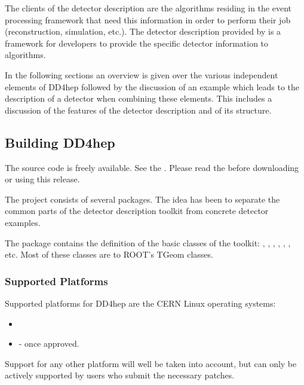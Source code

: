 \documentclass[10pt,a4paper]{article}
\begin{document}
\noindent
The clients of the detector description are the algorithms residing in the 
event processing framework that need this information in order to perform 
their job (reconstruction, simulation, etc.). 
The detector description provided by \DDhep is a framework for developers 
to provide the specific detector information to algorithms.

\noindent
In the following sections an overview is given over the various independent
elements of DD4hep followed by the discussion of an example which leads to 
the description of a detector when combining these elements.
This includes a discussion of the features of the \DDhep detector description
and of its structure. 

\subsection{Building DD4hep}
\label{sec:dd4hep-user-manual-building}

\noindent
The \DDhep source code is freely available. See the 
.
Please read the  
before downloading or using this release.

\noindent
The \DDhep project consists of several packages. The idea 
has been to separate the common parts of 
the detector description toolkit from concrete detector examples. 

\noindent
The package {} contains the definition of the basic classes 
of the toolkit: , , , ,
, , etc. Most of these classes are  
to ROOT's TGeom classes.

\subsubsection{Supported Platforms}
\label{sec:dd4hep-user-manual-platforms}
\noindent
Supported platforms for DD4hep are the CERN Linux operating systems:
\begin{itemize}
\item {}
\item {} - once approved.
\end{itemize}
Support for any other platform will well be taken into account, but can only
be actively supported by users who submit the necessary patches.
\end{document}
